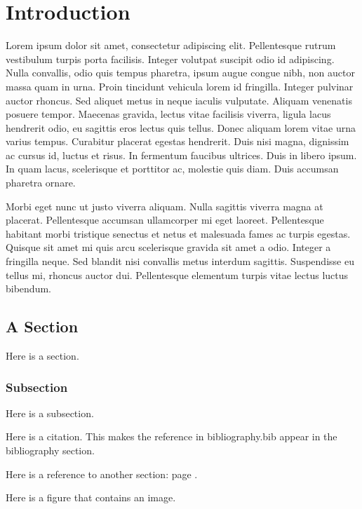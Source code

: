 \chapter{Introduction}
\label{chap:Introduction}

Lorem ipsum dolor sit amet, consectetur adipiscing elit. Pellentesque
rutrum vestibulum turpis porta facilisis. Integer volutpat suscipit
odio id adipiscing. Nulla convallis, odio quis tempus pharetra, ipsum
augue congue nibh, non auctor massa quam in urna. Proin tincidunt
vehicula lorem id fringilla. Integer pulvinar auctor rhoncus. Sed
aliquet metus in neque iaculis vulputate. Aliquam venenatis posuere
tempor. Maecenas gravida, lectus vitae facilisis viverra, ligula lacus
hendrerit odio, eu sagittis eros lectus quis tellus. Donec aliquam
lorem vitae urna varius tempus. Curabitur placerat egestas
hendrerit. Duis nisi magna, dignissim ac cursus id, luctus et
risus. In fermentum faucibus ultrices. Duis in libero ipsum. In quam
lacus, scelerisque et porttitor ac, molestie quis diam. Duis accumsan
pharetra ornare.

Morbi eget nunc ut justo viverra aliquam. Nulla sagittis viverra magna
at placerat. Pellentesque accumsan ullamcorper mi eget
laoreet. Pellentesque habitant morbi tristique senectus et netus et
malesuada fames ac turpis egestas. Quisque sit amet mi quis arcu
scelerisque gravida sit amet a odio. Integer a fringilla neque. Sed
blandit nisi convallis metus interdum sagittis. Suspendisse eu tellus
mi, rhoncus auctor dui. Pellentesque elementum turpis vitae lectus
luctus bibendum.



\section{A Section}
\label{sec:test}

Here is a section. 

\subsection{Subsection}
\label{subsec:s1}

Here is a subsection. 

Here \cite{2476800320070101} is a citation. This makes the reference
in bibliography.bib appear in the bibliography section. 

Here is a reference to another section: page \pageref{sec:another}.

Here is a figure that contains an image.

